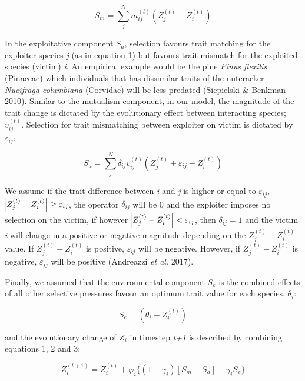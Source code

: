 \documentclass[a4paper, 12pt]{article}
\begin{document}
\begin{equation} \label{eq:1}
	S_{m} = \sum^{N}_{j} m^{(t)}_{ij}(Z^{(t)}_{j} - Z^{(t)}_{i})
\end{equation}

In the exploitative component $S_{a}$, selection favours trait matching for the exploiter species \textit{j} (as in equation 1) but favours trait mismatch for the exploited species (victim) \textit{i}. An empirical example would be the pine \textit{Pinus flexilis} (Pinaceae) which individuals that has dissimilar traits of the nutcracker \textit{Nucifraga columbiana} (Corvidae) will be less predated (Siepielski \& Benkman 2010). Similar to the mutualism component, in our model, the magnitude of the trait change is dictated by the evolutionary effect between interacting species; $v^{(t)}_{ij}$. Selection for trait mismatching between exploiter on victim is  dictated by $\varepsilon_{ij}$:

\begin{equation} \label{eq:2}
  S_{a} = \sum^{N}_{j}\delta_{ij}v^{(t)}_{ij}(Z^{(t)}_{j} \pm \varepsilon_{ij} - Z^{(t)}_{i})
\end{equation}

We assume if the trait difference between \textit{i} and \textit{j} is higher or equal to $\varepsilon_{ij}$, $\abs{Z^{(t)}_{j} - Z^{(t)}_{i}} \geq \varepsilon_{ij}$, the operator $\delta_{ij}$ will be 0 and the exploiter imposes no selection on the victim, if however $\abs{Z^{(t)}_{j} - Z^{(t)}_{i}} < \varepsilon_{ij}$, then $\delta_{ij} = 1$ and the victim \textit{i} will change in a positive or negative magnitude depending on the $Z^{(t)}_{j} - Z^{(t)}_{i}$ value. If $Z^{(t)}_{j} - Z^{(t)}_{i}$ is positive, $\varepsilon_{ij}$ will be negative. However, if $Z^{(t)}_{j} - Z^{(t)}_{i}$ is negative, $\varepsilon_{ij}$ will be  positive (Andreazzi \textit{et al.} 2017).

Finally, we assumed that the environmental component $S_{e}$ is the combined effects of all other selective pressures favour an optimum trait value for each species, $\theta_{i}$:

\begin{equation} \label{eq:3}
  S_{e} = (\theta_{i} - Z^{(t)}_{i})
\end{equation}

 and the evolutionary change of $Z_{i}$ in timestep\textit{ t+1} is described by combining equations 1, 2 and 3:

\begin{equation} \label{eq:4}
  Z^{(t+1)}_{i} = Z^{(t)}_{i} + \varphi_{i}\{(1 - \gamma_{i})[S_{m} + S_{a}] + \gamma_{i}S_{e}\}
\end{equation}
\end{document}
